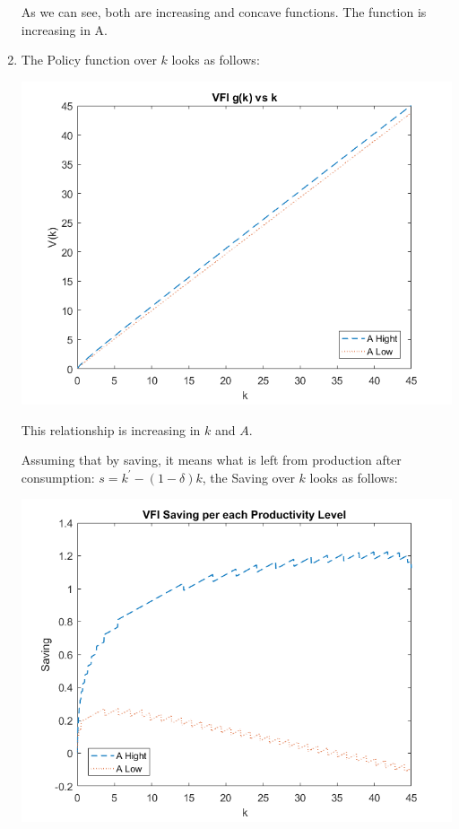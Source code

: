 \documentclass[12pt]{article}%
\begin{document}
\begin{enumerate}
	
	As we can see, both are increasing and concave functions. The function is increasing in A. 
	
	\item  The Policy function over $k$ looks as follows:
	
	\begin{center}
		\includegraphics[width=1\linewidth]{g_k}
	\end{center}

This relationship is increasing in $k$  and  $A$.
	
	Assuming that by saving, it means what is left from production after consumption: $s=k^{\prime}-(1-\delta)k$, the Saving over $k$ looks as follows:
	
	\begin{center}
		\includegraphics[width=1\linewidth]{saving}
	\end{center}
	

\end{enumerate}
\end{document}
